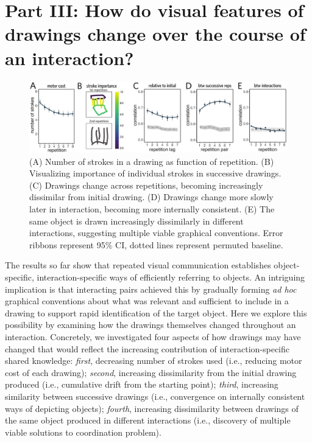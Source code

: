 \documentclass[10pt,letterpaper]{article}
\begin{document}
\section{Part III: How do visual features of drawings change over the course of an interaction?}

\begin{figure}
\includegraphics[width=0.96\linewidth]{figures/drawing_changes.pdf}
\caption{(A) Number of strokes in a drawing as function of repetition. (B) Visualizing importance of individual strokes in successive drawings. (C) Drawings change across repetitions, becoming increasingly dissimilar from initial drawing. (D) Drawings change more slowly later in interaction, becoming more internally consistent. (E) The same object is drawn increasingly dissimilarly in different interactions, suggesting multiple viable graphical conventions. Error ribbons represent 95\% CI, dotted lines represent permuted baseline.}
\label{within-across}
\end{figure}

The results so far show that repeated visual communication establishes object-specific, interaction-specific ways of efficiently referring to objects.
An intriguing implication is that interacting pairs achieved this by gradually forming \textit{ad hoc} graphical conventions about what was relevant and sufficient to include in a drawing to support rapid identification of the target object. 
Here we explore this possibility by examining how the drawings themselves changed throughout an interaction.
Concretely, we investigated four aspects of how drawings may have changed that would reflect the increasing contribution of interaction-specific shared knowledge: \textit{first}, decreasing number of strokes used (i.e., reducing motor cost of each drawing); \textit{second}, increasing dissimilarity from the initial drawing produced (i.e., cumulative drift from the starting point); \textit{third}, increasing similarity between successive drawings (i.e., convergence on internally consistent ways of depicting objects); \textit{fourth}, increasing dissimilarity between drawings of the same object produced in different interactions (i.e., discovery of multiple viable solutions to coordination problem). 
\end{document}
